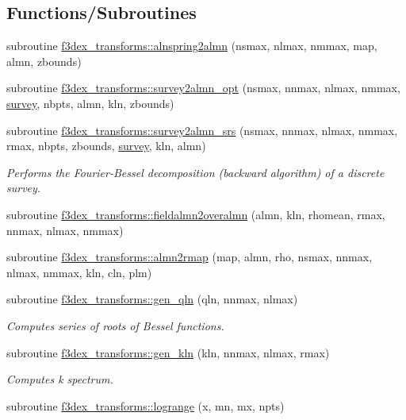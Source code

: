 \subsection*{Functions/Subroutines}
\begin{DoxyCompactItemize}
\item 
subroutine \hyperlink{namespacef3dex__transforms_aef309274871cf8eb0405b63f14ab26a2}{f3dex\_\-transforms::alnspring2almn} (nsmax, nlmax, nmmax, map, almn, zbounds)
\item 
subroutine \hyperlink{namespacef3dex__transforms_aa03041ae9480a0e4abc522b846a40cc8}{f3dex\_\-transforms::survey2almn\_\-opt} (nsmax, nnmax, nlmax, nmmax, \hyperlink{modulesurvey}{survey}, nbpts, almn, kln, zbounds)
\item 
subroutine \hyperlink{namespacef3dex__transforms_ae19f381573ccd64c64102bbd4181483f}{f3dex\_\-transforms::survey2almn\_\-srs} (nsmax, nnmax, nlmax, nmmax, rmax, nbpts, zbounds, \hyperlink{modulesurvey}{survey}, kln, almn)
\begin{DoxyCompactList}\small\item\em Performs the Fourier-\/Bessel decomposition (backward algorithm) of a discrete survey. \end{DoxyCompactList}\item 
subroutine \hyperlink{namespacef3dex__transforms_a4675d50d585b89b97772a0fa7dde4c5f}{f3dex\_\-transforms::fieldalmn2overalmn} (almn, kln, rhomean, rmax, nnmax, nlmax, nmmax)
\item 
subroutine \hyperlink{namespacef3dex__transforms_a3e792eb35f030b601d9262ac031cfdb9}{f3dex\_\-transforms::almn2rmap} (map, almn, rho, nsmax, nnmax, nlmax, nmmax, kln, cln, plm)
\item 
subroutine \hyperlink{namespacef3dex__transforms_a02b926f933d186f2c9d9ab6d478a1601}{f3dex\_\-transforms::gen\_\-qln} (qln, nnmax, nlmax)
\begin{DoxyCompactList}\small\item\em Computes series of roots of Bessel functions. \end{DoxyCompactList}\item 
subroutine \hyperlink{namespacef3dex__transforms_a4b80bc7cad52998fd0aff935a1695ee7}{f3dex\_\-transforms::gen\_\-kln} (kln, nnmax, nlmax, rmax)
\begin{DoxyCompactList}\small\item\em Computes k spectrum. \end{DoxyCompactList}\item 
subroutine \hyperlink{namespacef3dex__transforms_a2cd270ebc1186ae3872ab2e0068cff9d}{f3dex\_\-transforms::logrange} (x, mn, mx, npts)

\end{DoxyCompactItemize}
